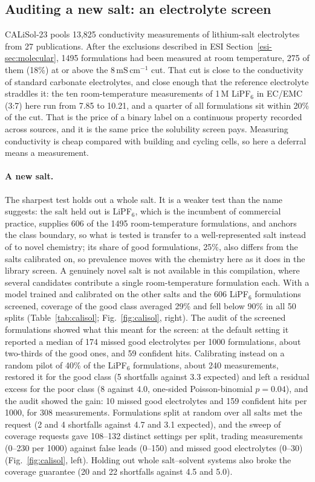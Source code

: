 \documentclass[twocolumn,10pt]{article}
\begin{document}
\subsection{Auditing a new salt: an electrolyte screen}
\label{sec:results:calisol}

CALiSol-23 pools 13,825 conductivity measurements of lithium-salt electrolytes from 27
publications.\citep{deBlasio2024CALiSol} After the exclusions described in ESI
Section~\ref{esi-sec:molecular}, 1495 formulations had been measured at room temperature, 275 of
them (18\%) at or above the $8\,\mathrm{mS\,cm^{-1}}$ cut. That cut is close to the conductivity
of standard carbonate electrolytes, and close enough that the reference electrolyte straddles it:
the ten room-temperature measurements of 1\,M LiPF$_6$ in EC/EMC (3:7) here run from 7.85 to
10.21, and a quarter of all formulations sit within 20\% of the cut. That is the price of a binary
label on a continuous property recorded across sources, and it is the same price the solubility
screen pays. Measuring conductivity is cheap compared with building and cycling cells, so here a
deferral means a measurement.

\paragraph{A new salt.} The sharpest test holds out a whole salt. It is a weaker test than the name suggests: the salt held out is LiPF$_6$, which is the incumbent of commercial practice, supplies 606 of the 1495 room-temperature formulations, and anchors the class boundary, so what is tested is transfer to a well-represented salt instead of to novel chemistry; its share of good formulations, 25\%, also differs from the salts calibrated on, so prevalence moves with the chemistry here as it does in the library screen. A genuinely novel salt is not available in this compilation, where several candidates contribute a single room-temperature formulation each. With a model trained and calibrated on the other salts and the 606 LiPF$_6$ formulations screened, coverage of the good class averaged 29\% and fell below 90\% in all 50 splits (Table~\ref{tab:calisol}; Fig.~\ref{fig:calisol}, right). The audit of the screened formulations showed what this meant for the screen: at the default setting it reported a median of 174 missed good electrolytes per 1000 formulations, about two-thirds of the good ones, and 59 confident hits. Calibrating instead on a random pilot of 40\% of the LiPF$_6$ formulations, about 240 measurements, restored it for the good class (5 shortfalls against 3.3 expected) and left a residual excess for the poor class (8 against 4.0, one-sided Poisson-binomial $p=0.04$), and the audit showed the gain: 10 missed good electrolytes and 159 confident hits per 1000, for 308 measurements. Formulations split at random over all salts met the request (2 and 4 shortfalls against 4.7 and 3.1 expected), and the sweep of coverage requests gave 108--132 distinct settings per split, trading measurements (0--230 per 1000) against false leads (0--150) and missed good electrolytes (0--30) (Fig.~\ref{fig:calisol}, left). Holding out whole salt--solvent systems also broke the coverage guarantee (20 and 22 shortfalls against 4.5 and 5.0).
\end{document}
